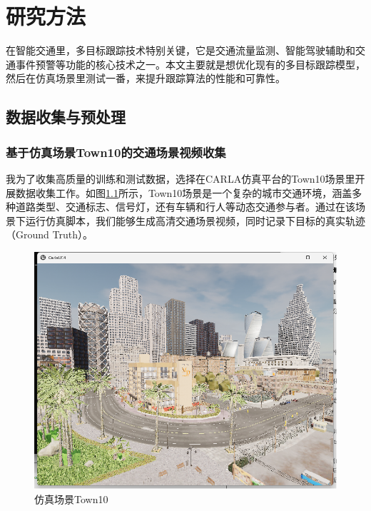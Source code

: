 \chapter{研究方法}


在智能交通里，多目标跟踪技术特别关键，它是交通流量监测、智能驾驶辅助和交通事件预警等功能的核心技术之一。本文主要就是想优化现有的多目标跟踪模型，然后在仿真场景里测试一番，来提升跟踪算法的性能和可靠性。


\section{数据收集与预处理}



\subsection{基于仿真场景Town10的交通场景视频收集}


我为了收集高质量的训练和测试数据，选择在CARLA仿真平台的Town10场景里开展数据收集工作。如图\ref{fig:p5}所示，Town10场景是一个复杂的城市交通环境，涵盖多种道路类型、交通标志、信号灯，还有车辆和行人等动态交通参与者。通过在该场景下运行仿真脚本，我们能够生成高清交通场景视频，同时记录下目标的真实轨迹（Ground Truth）。


\begin{figure}[htbp] %
	\centering
	\includegraphics[width=1\textwidth]{p5} %
	\caption{仿真场景Town10} %
	\label{fig:p5} %
\end{figure}





